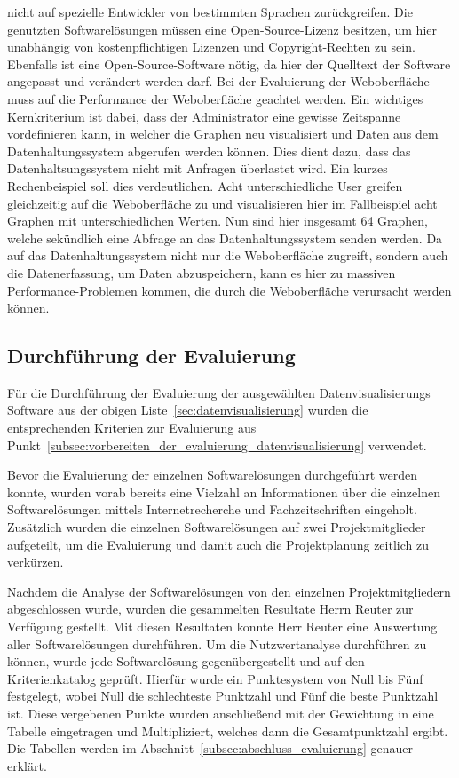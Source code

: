 \begin{outline}
  nicht auf spezielle Entwickler von bestimmten Sprachen zurückgreifen.
  \1 Die genutzten Softwarelösungen müssen eine Open-Source-Lizenz besitzen, um
  hier unabhängig von kostenpflichtigen Lizenzen und Copyright-Rechten zu sein.
  Ebenfalls ist eine Open-Source-Software nötig, da hier der Quelltext der
  Software angepasst und verändert werden darf.
  \1 Bei der Evaluierung der Weboberfläche muss auf die Performance der
  Weboberfläche geachtet werden. Ein wichtiges Kernkriterium ist dabei, dass
  der Administrator eine gewisse Zeitspanne vordefinieren kann, in welcher die
  Graphen neu visualisiert und Daten aus dem Datenhaltungssystem abgerufen
  werden können. Dies dient dazu, dass das Datenhaltsungssystem nicht mit
  Anfragen überlastet wird. Ein kurzes Rechenbeispiel soll dies verdeutlichen.
  Acht unterschiedliche User greifen gleichzeitig auf die Weboberfläche zu und
  visualisieren hier im Fallbeispiel acht Graphen mit unterschiedlichen
  Werten. Nun sind hier insgesamt 64 Graphen, welche sekündlich eine Abfrage an
  das Datenhaltungssystem senden werden. Da auf das Datenhaltungssystem nicht
  nur die Weboberfläche zugreift, sondern auch die Datenerfassung, um Daten
  abzuspeichern, kann es hier zu massiven Performance-Problemen kommen, die
  durch die Weboberfläche verursacht werden können.
\end{outline}
\mr%

\subsection{Durchführung der Evaluierung}
\label{subsec:durchfuehrung_evaluierung_datenvisualisierung}
Für die Durchführung der Evaluierung der ausgewählten Datenvisualisierungs
Software aus der obigen Liste~\ref{sec:datenvisualisierung} wurden die
entsprechenden Kriterien zur Evaluierung aus
Punkt~\ref{subsec:vorbereiten_der_evaluierung_datenvisualisierung} verwendet.


Bevor die Evaluierung der einzelnen Softwarelösungen durchgeführt werden
konnte, wurden vorab bereits eine Vielzahl an Informationen über die einzelnen
Softwarelösungen mittels Internetrecherche und Fachzeitschriften eingeholt.
Zusätzlich wurden die einzelnen Softwarelösungen auf zwei Projektmitglieder
aufgeteilt, um die Evaluierung und damit auch die Projektplanung zeitlich zu
verkürzen.

Nachdem die Analyse der Softwarelösungen von den einzelnen Projektmitgliedern
abgeschlossen wurde, wurden die gesammelten Resultate Herrn Reuter zur
Verfügung gestellt. Mit diesen Resultaten konnte Herr Reuter eine Auswertung
aller Softwarelösungen durchführen. Um die Nutzwertanalyse durchführen zu
können, wurde jede Softwarelösung gegenübergestellt und auf den
Kriterienkatalog geprüft. Hierfür wurde ein Punktesystem von Null bis Fünf
festgelegt, wobei Null die schlechteste Punktzahl und Fünf die beste Punktzahl
ist. Diese vergebenen Punkte wurden anschließend mit der Gewichtung in eine
Tabelle eingetragen und Multipliziert, welches dann die Gesamtpunktzahl ergibt.
Die Tabellen werden im Abschnitt~\ref{subsec:abschluss_evaluierung} genauer
erklärt.

